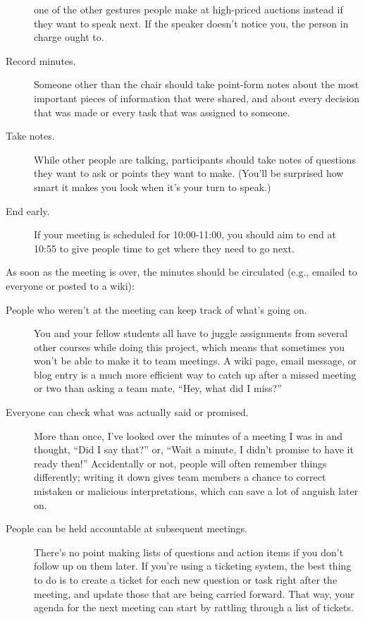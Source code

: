 \begin{description}
one of the other gestures people make at high-priced auctions
instead if they want to speak next. If the speaker doesn't notice
you, the person in charge ought to.
\item[Record minutes.]
Someone other than the chair should take point-form notes about the
most important pieces of information that were shared, and about
every decision that was made or every task that was assigned to
someone.
\item[Take notes.]
While other people are talking, participants should take notes of
questions they want to ask or points they want to make. (You'll be
surprised how smart it makes you look when it's your turn to speak.)
\item[End early.]
If your meeting is scheduled for 10:00-11:00, you should aim to end
at 10:55 to give people time to get where they need to go next.
\end{description}

As soon as the meeting is over, the minutes should be circulated (e.g.,
emailed to everyone or posted to a wiki):

\begin{description}
\item[People who weren't at the meeting can keep track of what's going on.]
You and your fellow students all have to juggle assignments from
several other courses while doing this project, which means that
sometimes you won't be able to make it to team meetings. A wiki
page, email message, or blog entry is a much more efficient way to
catch up after a missed meeting or two than asking a team mate,
``Hey, what did I miss?''
\item[Everyone can check what was actually said or promised.]
More than once, I've looked over the minutes of a meeting I was in
and thought, ``Did I say that?'' or, ``Wait a minute, I didn't promise
to have it ready then!'' Accidentally or not, people will often
remember things differently; writing it down gives team members a
chance to correct mistaken or malicious interpretations, which can
save a lot of anguish later on.
\item[People can be held accountable at subsequent meetings.]
There's no point making lists of questions and action items if you
don't follow up on them later. If you're using a ticketing system,
the best thing to do is to create a ticket for each new question or
task right after the meeting, and update those that are being
carried forward. That way, your agenda for the next meeting can
start by rattling through a list of tickets.
\end{description}

